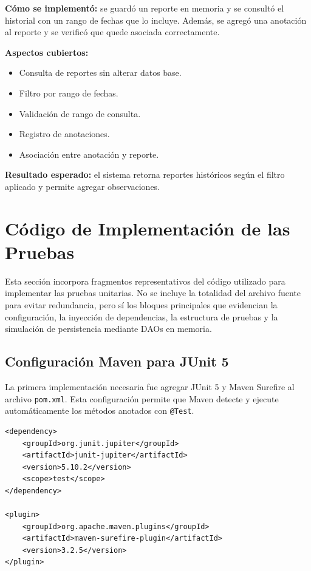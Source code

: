 \documentclass[12pt,a4paper]{article}
\begin{document}
\textbf{Cómo se implementó:} se guardó un reporte en memoria y se consultó el historial con un rango de fechas que lo incluye. Además, se agregó una anotación al reporte y se verificó que quede asociada correctamente.

\textbf{Aspectos cubiertos:}
\begin{itemize}[leftmargin=*]
    \item Consulta de reportes sin alterar datos base.
    \item Filtro por rango de fechas.
    \item Validación de rango de consulta.
    \item Registro de anotaciones.
    \item Asociación entre anotación y reporte.
\end{itemize}

\textbf{Resultado esperado:} el sistema retorna reportes históricos según el filtro aplicado y permite agregar observaciones.

\section{Código de Implementación de las Pruebas}

Esta sección incorpora fragmentos representativos del código utilizado para implementar las pruebas unitarias. No se incluye la totalidad del archivo fuente para evitar redundancia, pero sí los bloques principales que evidencian la configuración, la inyección de dependencias, la estructura de pruebas y la simulación de persistencia mediante DAOs en memoria.

\subsection{Configuración Maven para JUnit 5}

La primera implementación necesaria fue agregar JUnit 5 y Maven Surefire al archivo \texttt{pom.xml}. Esta configuración permite que Maven detecte y ejecute automáticamente los métodos anotados con \texttt{@Test}.

\begin{lstlisting}[style=javaStyle, caption={Dependencias y plugin de pruebas en pom.xml}]
<dependency>
    <groupId>org.junit.jupiter</groupId>
    <artifactId>junit-jupiter</artifactId>
    <version>5.10.2</version>
    <scope>test</scope>
</dependency>

<plugin>
    <groupId>org.apache.maven.plugins</groupId>
    <artifactId>maven-surefire-plugin</artifactId>
    <version>3.2.5</version>
</plugin>
\end{lstlisting}
\end{document}
